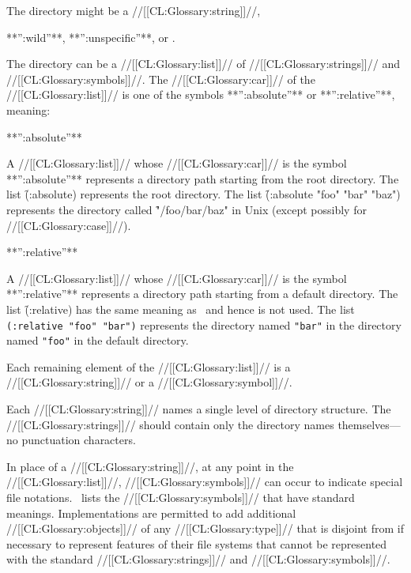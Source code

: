\endsubsubsubsection%


The directory might be a //[[CL:Glossary:string]]//,

**'':wild''**, **'':unspecific''**, or \nil.

The directory can be a //[[CL:Glossary:list]]// of //[[CL:Glossary:strings]]// and //[[CL:Glossary:symbols]]//.   The //[[CL:Glossary:car]]// of the //[[CL:Glossary:list]]// is one of the symbols **'':absolute''** or  **'':relative''**, meaning:

\beginlist

\item{**'':absolute''**}

  A //[[CL:Glossary:list]]// whose //[[CL:Glossary:car]]// is the symbol **'':absolute''** represents 
  a directory path starting from the root directory.  The list 
  \f{(:absolute)} represents the root directory.  The list 
  \f{(:absolute "foo" "bar" "baz")} represents the directory called
  \f{"/foo/bar/baz"} in Unix (except possibly for //[[CL:Glossary:case]]//).
  \item{**'':relative''**}

  A //[[CL:Glossary:list]]// whose //[[CL:Glossary:car]]// is the symbol **'':relative''** represents 
  a directory path starting from a default directory.  
  The list \f{(:relative)} has the same meaning as \nil\ and hence is not used.
  The list {\tt (:relative "foo" "bar")} represents the directory named {\tt "bar"} 
  in the directory named {\tt "foo"} in the default directory.

\endlist

Each remaining element of the //[[CL:Glossary:list]]// is a //[[CL:Glossary:string]]// or a //[[CL:Glossary:symbol]]//.

Each //[[CL:Glossary:string]]// names a single level of directory structure. The //[[CL:Glossary:strings]]// should contain only the directory names  themselves---no punctuation characters.

In place of a //[[CL:Glossary:string]]//, at any point in the //[[CL:Glossary:list]]//, //[[CL:Glossary:symbols]]//  can occur to indicate special file notations. \Thenextfigure\ lists the //[[CL:Glossary:symbols]]// that have standard meanings. Implementations are permitted to add additional //[[CL:Glossary:objects]]//  of any //[[CL:Glossary:type]]// that is disjoint from  if necessary to represent features of their file systems that cannot be represented with the standard //[[CL:Glossary:strings]]// and //[[CL:Glossary:symbols]]//.

